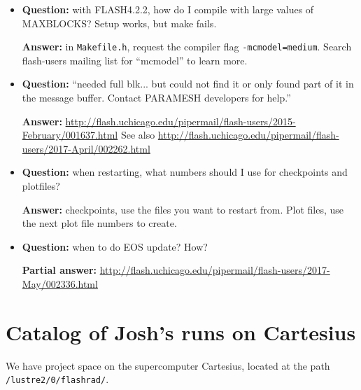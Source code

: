 \documentclass[10pt]{article}
\begin{document}
\begin{itemize}
    \item \textbf{Question:} with FLASH4.2.2, how do I compile with large
        values of MAXBLOCKS?  Setup works, but make fails.

    \textbf{Answer:} in \texttt{Makefile.h}, request the compiler flag
        \texttt{-mcmodel=medium}.  Search flash-users mailing list for
        ``mcmodel'' to learn more.

    \item \textbf{Question:} ``needed full blk... but could not find it or only
        found part of it in the message buffer. Contact PARAMESH developers for
        help.''

    \textbf{Answer:}
    \url{http://flash.uchicago.edu/pipermail/flash-users/2015-February/001637.html}
    See also
    \url{http://flash.uchicago.edu/pipermail/flash-users/2017-April/002262.html}

    \item \textbf{Question:} when restarting, what numbers should I use for
        checkpoints and plotfiles?

    \textbf{Answer:} checkpoints, use the files you want to restart from.
        Plot files, use the next plot file numbers to create.

\item \textbf{Question:} when to do EOS update?  How?

    \textbf{Partial answer:}
    \url{http://flash.uchicago.edu/pipermail/flash-users/2017-May/002336.html}

\end{itemize}


\section{Catalog of Josh's runs on Cartesius}

We have project space on the supercomputer Cartesius,
located at the path \texttt{/lustre2/0/flashrad/}.
\end{document}
